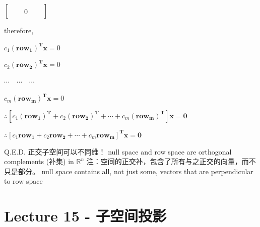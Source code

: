 \documentclass[12pt, a4paper]{article}
\begin{document}
{\begin{math}
\begin{bmatrix}
		\ & \ & \ \\
		\quad & 0 & \quad \\
	\end{bmatrix}
\end{math}
\par therefore,
\par\qquad $c_1{\mathbf{(row_1)^T}}{\mathbf{x}} = 0$
\par\qquad $c_2{\mathbf{(row_2)^T}}{\mathbf{x}} = 0$
\par\qquad $\cdots\quad\cdots\quad\cdots$
\par\qquad $c_m{\mathbf{(row_m)^T}}{\mathbf{x}} = 0$
\par $\therefore \left[ c_1{\mathbf{(row_1)^T}} + c_2{\mathbf{(row_2)^T}} + \cdots + c_m{\mathbf{(row_m)^T}} \right]{\mathbf{x}} = {\mathbf{0}}$
\par $\therefore \left[ c_1{\mathbf{row_1}} + c_2{\mathbf{row_2}} + \cdots + c_m{\mathbf{row_m}} \right]^{\mathbf{T}}{\mathbf{x}} = {\mathbf{0}}$
\par Q.E.D.
\vspace{14pt}
\newline
{\textcolor{anhao-scarlet}{正交子空间可以不同维！}}
\vspace{14pt}
\newline
null space and row space are orthogonal complements (补集) in $\mathbb{R}^n$
\newline
注：空间的正交补，包含了所有与之正交的向量，而不只是部分。
\newline
null space contains all, not just some, vectors that are perpendicular to row space

\newpage
\section{Lecture 15 - 子空间投影}
\pagestyle{fancy}
\lhead{}
\rhead{}

}
\end{document}
